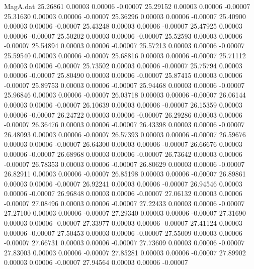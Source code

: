 \begin{filecontents}{MagA.dat}
  25.26861    0.00003    0.00006   -0.00007
  25.29152    0.00003    0.00006   -0.00007
  25.31630    0.00003    0.00006   -0.00007
  25.36296    0.00003    0.00006   -0.00007
  25.40900    0.00003    0.00006   -0.00007
  25.43248    0.00003    0.00006   -0.00007
  25.47925    0.00003    0.00006   -0.00007
  25.50202    0.00003    0.00006   -0.00007
  25.52593    0.00003    0.00006   -0.00007
  25.54894    0.00003    0.00006   -0.00007
  25.57213    0.00003    0.00006   -0.00007
  25.59540    0.00003    0.00006   -0.00007
  25.68816    0.00003    0.00006   -0.00007
  25.71112    0.00003    0.00006   -0.00007
  25.73502    0.00003    0.00006   -0.00007
  25.75794    0.00003    0.00006   -0.00007
  25.80490    0.00003    0.00006   -0.00007
  25.87415    0.00003    0.00006   -0.00007
  25.89753    0.00003    0.00006   -0.00007
  25.94468    0.00003    0.00006   -0.00007
  25.96846    0.00003    0.00006   -0.00007
  26.03718    0.00003    0.00006   -0.00007
  26.06144    0.00003    0.00006   -0.00007
  26.10639    0.00003    0.00006   -0.00007
  26.15359    0.00003    0.00006   -0.00007
  26.24722    0.00003    0.00006   -0.00007
  26.29286    0.00003    0.00006   -0.00007
  26.36476    0.00003    0.00006   -0.00007
  26.43398    0.00003    0.00006   -0.00007
  26.48093    0.00003    0.00006   -0.00007
  26.57393    0.00003    0.00006   -0.00007
  26.59676    0.00003    0.00006   -0.00007
  26.64300    0.00003    0.00006   -0.00007
  26.66676    0.00003    0.00006   -0.00007
  26.68968    0.00003    0.00006   -0.00007
  26.73642    0.00003    0.00006   -0.00007
  26.78353    0.00003    0.00006   -0.00007
  26.80629    0.00003    0.00006   -0.00007
  26.82911    0.00003    0.00006   -0.00007
  26.85198    0.00003    0.00006   -0.00007
  26.89861    0.00003    0.00006   -0.00007
  26.92241    0.00003    0.00006   -0.00007
  26.94546    0.00003    0.00006   -0.00007
  26.96848    0.00003    0.00006   -0.00007
  27.06132    0.00003    0.00006   -0.00007
  27.08496    0.00003    0.00006   -0.00007
  27.22433    0.00003    0.00006   -0.00007
  27.27100    0.00003    0.00006   -0.00007
  27.29340    0.00003    0.00006   -0.00007
  27.31690    0.00003    0.00006   -0.00007
  27.33977    0.00003    0.00006   -0.00007
  27.41124    0.00003    0.00006   -0.00007
  27.50453    0.00003    0.00006   -0.00007
  27.55009    0.00003    0.00006   -0.00007
  27.66731    0.00003    0.00006   -0.00007
  27.73609    0.00003    0.00006   -0.00007
  27.83003    0.00003    0.00006   -0.00007
  27.85281    0.00003    0.00006   -0.00007
  27.89902    0.00003    0.00006   -0.00007
  27.94564    0.00003    0.00006   -0.00007

\end{filecontents}
